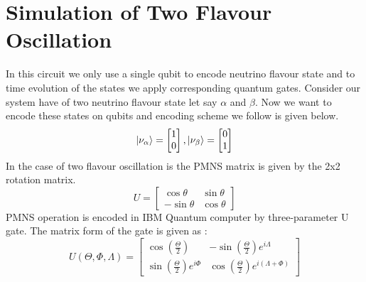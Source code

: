 \documentclass[12pt,a4paper]{report}
\begin{document}
\section{Simulation of Two Flavour Oscillation}\label{2FO}
In this circuit we only use a single qubit to encode neutrino flavour state and to time evolution of the states we apply corresponding quantum gates. Consider our system have of two neutrino flavour state let say $\alpha$ and $\beta$. Now we want to encode these states on qubits and encoding scheme we follow is given below.
\begin{equation}
\begin{split} 
\label{eq:14}
\ket{\nu_{\alpha}}=\begin{bmatrix} 1 \\ 0 \end{bmatrix} , 
\ket{\nu_{\beta}}=\begin{bmatrix} 0 \\ 1 \end{bmatrix}
\end{split}
\end{equation}
In the case of two flavour oscillation is the PMNS matrix is given by the 2x2 rotation matrix.
\begin{equation}
U=\begin{bmatrix} \cos\theta & \sin\theta \\ -\sin\theta & 
\cos\theta \end{bmatrix}
\end{equation}
PMNS operation is encoded in  IBM Quantum computer by three-parameter U gate. The matrix form of the gate is given as :
\begin{equation}
	\label{eq:15}
	U (\Theta,\Phi,\Lambda) =\begin{bmatrix} \cos\left(\frac{\Theta}{2}\right) & -\sin\left(\frac{\Theta}{2}\right)e^{i\Lambda} \\ \sin\left(\frac{\Theta}{2}\right)e^{i\Phi} & 
		\cos\left(\frac{\Theta}{2}\right)e^{i(\Lambda + \Phi)} \end{bmatrix}
\end{equation}
\end{document}
